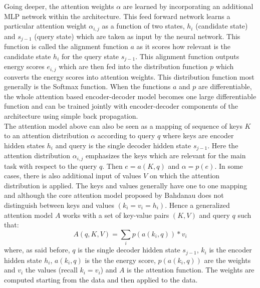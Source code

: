 \documentclass[11pt]{article}
\begin{document}
Going deeper, the attention weights $\alpha$ are learned by incorporating an additional MLP network within the architecture. This feed forward network learns a particular attention weight $\alpha_{i,j}$ as a function of two states, $h_i$ (candidate state) and $s_{j-1}$ (query state) which are taken as input by the neural network. This function is called the alignment function $a$ as it scores how relevant is the candidate state $h_i$ for the query state $s_{j-1}$. This alignment function outputs energy scores $e_{i,j}$ which are then fed into the distribution function $p$ which converts the energy scores into attention weights. This distribution function most generally is the Softmax function. When the functions $a$ and $p$ are differentiable, the whole attention based encoder-decoder model becomes one large differentiable function and can be trained jointly with encoder-decoder components of the architecture using simple back propagation. \\

The attention model above can also be seen as a mapping of sequence of keys $K$ to an attention distribution $\alpha$ according to query $q$ where keys are encoder hidden states $h_i$ and query is the single decoder hidden state $s_{j-1}$. Here the attention distribution $\alpha_{i,j}$ emphasizes the keys which are relevant for the main task with respect to the query $q$. Then $e = a(K,q)$ and $\alpha = p(e)$. In some cases, there is also additional input of values $V$ on which the attention distribution is applied. The keys and values generally have one to one mapping and although the core attention model proposed by Bahdanau\cite{Bahdanau} does not distinguish between keys and values $(k_i = v_i = h_i )$. Hence a generalized attention model $A$ works with a set of key-value pairs $(K, V )$ and query $q$ such that:
\begin{displaymath}
A(q,K,V) = \sum_i p(a(k_i, q)) \ast v_i
\end{displaymath}
where, as said before, $q$ is the single decoder hidden state  $s_{j-1}$, $k_i$ is the encoder hidden state $h_i$, $a(k_i, q)$ is the the energy score, $p(a(k_i, q))$ are the weights and $v_i$ the values (recall \newline $k_i = v_i$) and $A$ is the attention function. The weights are computed starting from the data and then applied to the data. \\ 
\end{document}
